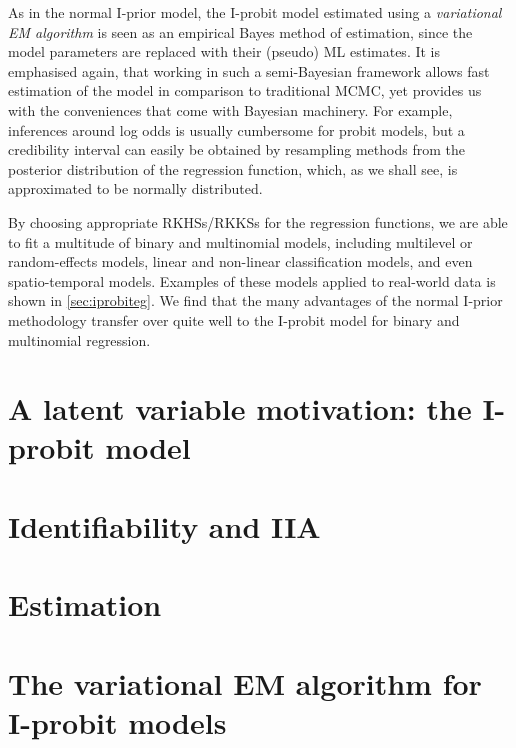 \documentclass[showframe,11pt,twoside,openright]{report}
\begin{document}
As in the normal I-prior model, the I-probit model estimated using a \emph{variational EM algorithm} is seen as an empirical Bayes method of estimation, since the model parameters are replaced with their (pseudo) ML estimates.
It is emphasised again, that working in such a semi-Bayesian framework allows fast estimation of the model in comparison to traditional MCMC, yet provides us with the conveniences that come with Bayesian machinery.
For example, inferences around log odds is usually cumbersome for probit models, but a credibility interval can easily be obtained by resampling methods from the posterior distribution of the regression function, which, as we shall see, is approximated to be normally distributed.

By choosing appropriate RKHSs/RKKSs for the regression functions, we are able to fit a multitude of binary and multinomial models, including multilevel or random-effects models, linear and non-linear classification models, and even spatio-temporal models.
Examples of these models applied to real-world data is shown in  \cref{sec:iprobiteg}.
We find that the many advantages of the normal I-prior methodology  transfer over quite well to the I-probit model for binary and multinomial regression.

%

\section{A latent variable motivation: the I-probit model}


\section{Identifiability and IIA}\label{sec:iia}


\section{Estimation}


\section{The variational EM algorithm for I-probit models}\label{sec:iprobitvar}

\end{document}

